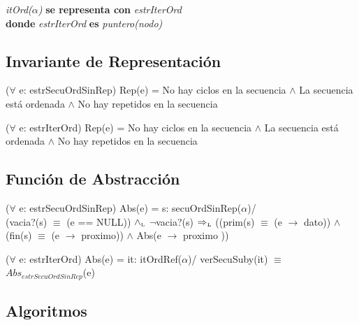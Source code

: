 \textit{itOrd($\alpha$)} \textbf{se representa con} \textit{estrIterOrd}\\
\textbf{donde} \textit{estrIterOrd} \textbf{es} \textit{puntero(nodo)}\\

\subsection*{Invariante de Representaci\'on}
\vspace{11pt}
($\forall$ e: estrSecuOrdSinRep) Rep(e) = No hay ciclos en la secuencia $\wedge$ La secuencia est\'a ordenada $\wedge$ No hay repetidos en la secuencia

\vspace{22pt}

\vspace{11pt}
($\forall$ e: estrIterOrd) Rep(e) = No hay ciclos en la secuencia $\wedge$ La secuencia est\'a ordenada $\wedge$ No hay repetidos en la secuencia

\vspace{33pt}

\subsection*{Funci\'on de Abstracci\'on}
\vspace{11pt}
($\forall$ e: estrSecuOrdSinRep) Abs(e) = s: secuOrdSinRep($\alpha$)/\\
(vacia?(s) $\equiv$ (e == NULL)) $\land_{\mathrm{\scriptscriptstyle{L}}}$ $\neg$vacia?(s) $\Rightarrow_{\mathrm{\scriptscriptstyle{L}}}$ ((prim(s) $\equiv$ (e $\rightarrow$ dato)) $\wedge$ (fin(s) $\equiv$ (e $\rightarrow$ proximo)) $\wedge$ Abs(e $\rightarrow$ proximo ))

\vspace{22pt}

\vspace{11pt}
($\forall$ e: estrIterOrd) Abs(e) = it: itOrdRef($\alpha$)/ verSecuSuby(it) $\equiv$ $Abs_{estrSecuOrdSinRep}$(e)

\newpage 

\subsection*{Algoritmos}

